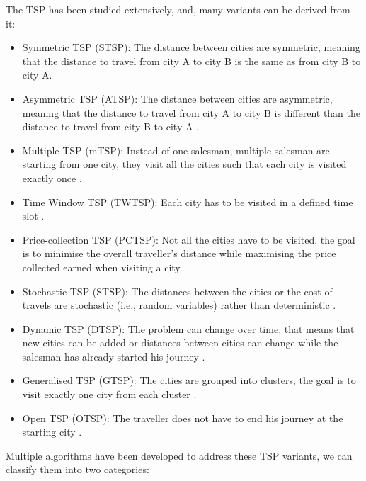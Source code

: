 \documentclass[conference]{IEEEtran}
\begin{document}
The TSP has been studied extensively, and, many variants can be derived from it:

\begin{itemize}
    \item Symmetric TSP (STSP): The distance between cities are symmetric, meaning that the distance to travel from city A to city B is the same as from city B to city A. %
    \item Asymmetric TSP (ATSP): The distance between cities are asymmetric, meaning that the distance to travel from city A to city B is different than the distance to travel from city B to city A \cite{ASTP}.
    \item Multiple TSP (mTSP): Instead of one salesman, multiple salesman are starting from one city, they visit all the cities such that each city is visited exactly once \cite{mTSP}.
    \item Time Window TSP (TWTSP): Each city has to be visited in a defined time slot \cite{TWTSP}.
    \item Price-collection TSP (PCTSP): Not all the cities have to be visited, the goal is to minimise the overall traveller's distance while maximising the price collected earned when visiting a city \cite{PCTSP}.
    \item Stochastic TSP (STSP): The distances between the cities or the cost of travels are stochastic (i.e., random variables) rather than deterministic \cite{Stochastic_TSP}.
    \item Dynamic TSP (DTSP): The problem can change over time, that means that new cities can be added or distances between cities can change while the salesman has already started his journey \cite{DTSP}.
    \item Generalised TSP (GTSP): The cities are grouped into clusters, the goal is to visit exactly one city from each cluster \cite{GTSP}.
    \item Open TSP (OTSP): The traveller does not have to end his journey at the starting city \cite{OTSP}.
\end{itemize}

Multiple algorithms have been developed to address these TSP variants, we can classify them into two categories:
\end{document}
